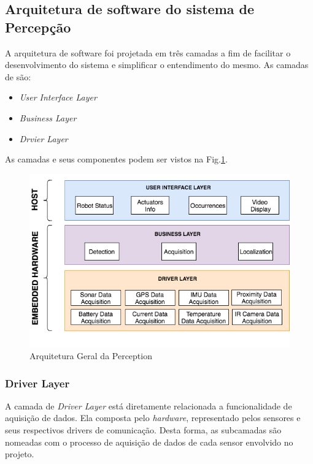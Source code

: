  \pagebreak

\subsection{Arquitetura de software do sistema de Percepção}
\label{ssec:arqsp}


A arquitetura de software foi projetada em três camadas a fim de facilitar o desenvolvimento do sistema e simplificar o entendimento do mesmo. As camadas de são:

\begin{itemize}
	\item \textit{User Interface Layer}
	\item \textit{Business Layer}
	\item \textit{Drvier Layer}
\end{itemize}
 
As camadas e seus componentes podem ser vistos na Fig.\ref{arqsoft}.

\begin{figure}[h]
	\centering
	\includegraphics[width=15cm]{Figures/ArquiteturadeSoftware.png}
	\caption{Arquitetura Geral da Perception}
	\label{arqsoft}
\end{figure}

\subsubsection{Driver Layer}
	
A camada de \textit{Driver Layer} está diretamente relacionada a funcionalidade de aquisição de dados. Ela composta pelo \textit{hardware}, representado pelos sensores e seus respectivos drivers de comunicação. Desta forma, as subcamadas são nomeadas com o processo de aquisição de dados de cada sensor envolvido no projeto.

